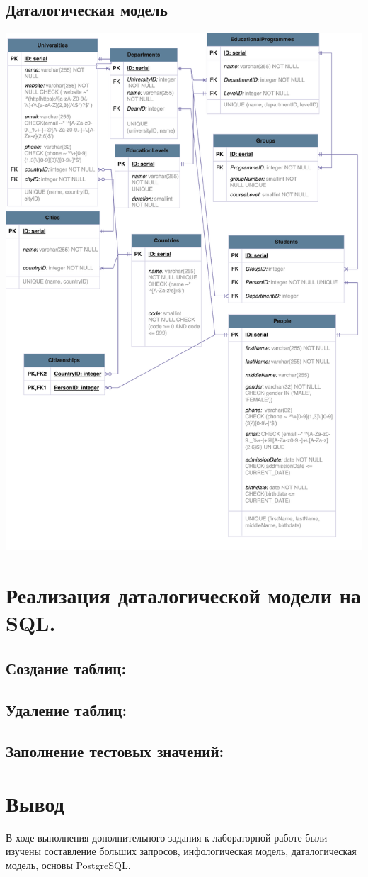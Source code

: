 \documentclass[12pt,onecolumn]{article}
\begin{document}
\subsection{Даталогическая модель}
\includegraphics[width=\textwidth]{image/dop-2-datalogical-model.png}
\section{Реализация даталогической модели на SQL.}
\subsection*{Создание таблиц:}

\subsection*{Удаление таблиц:}

\subsection*{Заполнение тестовых значений:}

\section{Вывод}
В ходе выполнения дополнительного задания к лабораторной работе были изучены составление больших запросов,
инфологическая модель, даталогическая модель, основы PostgreSQL.
\end{document}
